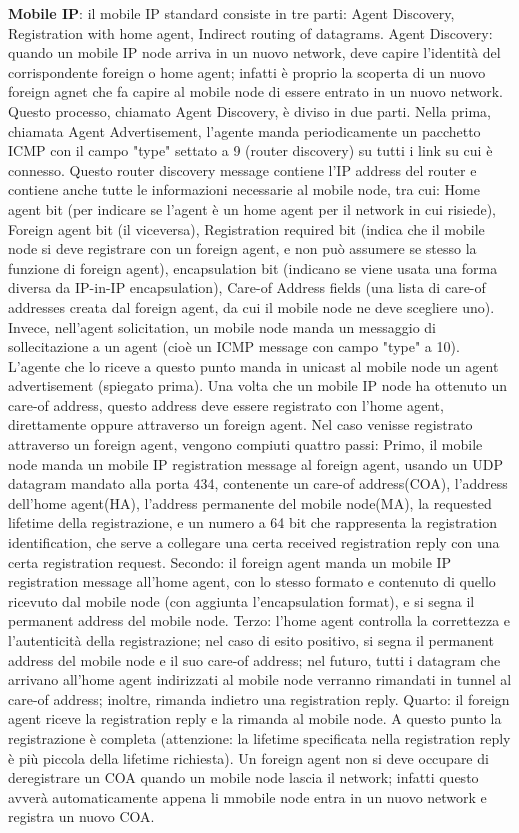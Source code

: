 \documentclass[a4paper,10pt]{article} %
\renewcommand{\b}[1]{%
    {\textbf{#1}}}
\begin{document}
\b{Mobile IP}: il mobile IP standard consiste in tre parti: Agent Discovery, Registration with home agent, Indirect routing of datagrams. Agent Discovery: quando un mobile IP node arriva in un nuovo network, deve capire l'identità del corrispondente foreign o home agent; infatti è proprio la scoperta di un nuovo foreign agnet che fa capire al mobile node di essere entrato in un nuovo network. Questo processo, chiamato Agent Discovery, è diviso in due parti. Nella prima, chiamata Agent Advertisement, l'agente manda periodicamente un pacchetto ICMP con il campo "type" settato a 9 (router discovery) su tutti i link su cui è connesso. Questo router discovery message contiene l'IP address del router e contiene anche tutte le informazioni necessarie al mobile node, tra cui: Home agent bit (per indicare se l'agent è un home agent per il network in cui risiede), Foreign agent bit (il viceversa), Registration required bit (indica che il mobile node si deve registrare con un foreign agent, e non può assumere se stesso la funzione di foreign agent), encapsulation bit (indicano se viene usata una forma diversa da IP-in-IP encapsulation), Care-of Address fields (una lista di care-of addresses creata dal foreign agent, da cui il mobile node ne deve scegliere uno). Invece, nell'agent solicitation, un mobile node manda un messaggio di sollecitazione a un agent (cioè un ICMP message con campo "type" a 10). L'agente che lo riceve a questo punto manda in unicast al mobile node un agent advertisement (spiegato prima). Una volta che un mobile IP node ha ottenuto un care-of address, questo address deve essere registrato con l'home agent, direttamente oppure attraverso un foreign agent. Nel caso venisse registrato attraverso un foreign agent, vengono compiuti quattro passi: Primo, il mobile node manda un mobile IP registration message al foreign agent, usando un UDP datagram mandato alla porta 434, contenente un care-of address(COA), l'address dell'home agent(HA), l'address permanente del mobile node(MA), la requested lifetime della registrazione, e un numero a 64 bit che rappresenta la registration identification, che serve a collegare una certa received registration reply con una certa registration request. Secondo: il foreign agent manda un mobile IP registration message all'home agent, con lo stesso formato e contenuto di quello ricevuto dal mobile node (con aggiunta l'encapsulation format), e si segna il permanent address del mobile node. Terzo: l'home agent controlla la correttezza e l'autenticità della registrazione; nel caso di esito positivo, si segna il permanent address del mobile node e il suo care-of address; nel futuro, tutti i datagram che arrivano all'home agent indirizzati al mobile node verranno rimandati in tunnel al care-of address; inoltre, rimanda indietro una registration reply. Quarto: il foreign agent riceve la registration reply e la rimanda al mobile node. A questo punto la registrazione è completa (attenzione: la lifetime specificata nella registration reply è più piccola della lifetime richiesta). Un foreign agent non si deve occupare di deregistrare un COA quando un mobile node lascia il network; infatti questo avverà automaticamente appena li mmobile node entra in un nuovo network e registra un nuovo COA.
\end{document}
